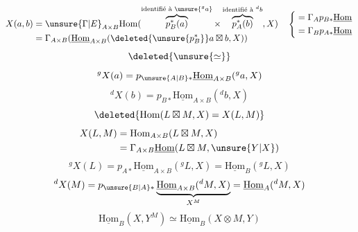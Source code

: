 \[
\begin{aligned}
X(a,b)&=\unsure{\Gamma|E}_{A\times B}\mathrm{Hom}(\overbrace{p_B^*(a)}^{\text{identifié à }\unsure{{}^g a}}\times\overbrace{p_A^*(b)}^{\text{identifié à }{}^d b},X)\\
&=\Gamma_{A\times B}(\underline{\mathrm{Hom}}_{A\times B}(\deleted{\unsure{p_B^*}}a\boxtimes b,X))
\end{aligned}
\quad\left\{\begin{aligned}&=\Gamma_A p_{B*}\underline{\mathrm{Hom}}\\&=\Gamma_B p_{A*}\underline{\mathrm{Hom}}\end{aligned}\right.
\]
\[
\deleted{\unsure{\simeq}}
\]
\[
{}^gX(a)=p_{\unsure{A|B}*}\underline{\mathrm{Hom}}_{A\times B}({}^ga,X)
\]
\[
{}^dX(b)=p_{B*}\underline{\mathrm{Hom}}_{A\times B}({}^db,X)
\]
\[
\deleted{\mathrm{Hom}(L\boxtimes M,X)=X(L,M)}
\]
\[
\begin{aligned}
X(L,M)&=\mathrm{Hom}_{A\times B}(L\boxtimes M,X)\\
&=\Gamma_{A\times B}\underline{\mathrm{Hom}}(L\boxtimes M,\unsure{Y|X})
\end{aligned}
\]
\[
{}^gX(L)=p_{A*}\underline{\mathrm{Hom}}_{A\times B}({}^gL,X)=\underline{\mathrm{Hom}}_B({}^gL,X)
\]
\[
{}^dX(M)=p_{\unsure{B|A}*}\underbrace{\underline{\mathrm{Hom}}_{A\times B}({}^dM,X)}_{X^M}=\underline{\mathrm{Hom}}_A({}^dM,X)
\]
\[
\underline{\mathrm{Hom}}_B(X,Y^M)\simeq\underline{\mathrm{Hom}}_B(X\otimes M,Y)
\]

